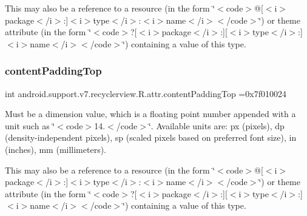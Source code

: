 This may also be a reference to a resource (in the form \char`\"{}$<$code$>$@\mbox{[}$<$i$>$package$<$/i$>$\+:\mbox{]}$<$i$>$type$<$/i$>$\+:$<$i$>$name$<$/i$>$$<$/code$>$\char`\"{}) or theme attribute (in the form \char`\"{}$<$code$>$?\mbox{[}$<$i$>$package$<$/i$>$\+:\mbox{]}\mbox{[}$<$i$>$type$<$/i$>$\+:\mbox{]}$<$i$>$name$<$/i$>$$<$/code$>$\char`\"{}) containing a value of this type. \mbox{\label{classandroid_1_1support_1_1v7_1_1recyclerview_1_1R_1_1attr_a9866843ed1b48c21614c5d076d85c4c3}} 
\subsubsection{\texorpdfstring{content\+Padding\+Top}{contentPaddingTop}}
{\footnotesize\ttfamily int android.\+support.\+v7.\+recyclerview.\+R.\+attr.\+content\+Padding\+Top =0x7f010024\hspace{0.3cm}{\ttfamily [static]}}

Must be a dimension value, which is a floating point number appended with a unit such as \char`\"{}$<$code$>$14.\+5sp$<$/code$>$\char`\"{}. Available units are\+: px (pixels), dp (density-\/independent pixels), sp (scaled pixels based on preferred font size), in (inches), mm (millimeters). 

This may also be a reference to a resource (in the form \char`\"{}$<$code$>$@\mbox{[}$<$i$>$package$<$/i$>$\+:\mbox{]}$<$i$>$type$<$/i$>$\+:$<$i$>$name$<$/i$>$$<$/code$>$\char`\"{}) or theme attribute (in the form \char`\"{}$<$code$>$?\mbox{[}$<$i$>$package$<$/i$>$\+:\mbox{]}\mbox{[}$<$i$>$type$<$/i$>$\+:\mbox{]}$<$i$>$name$<$/i$>$$<$/code$>$\char`\"{}) containing a value of this type. \mbox{\label{classandroid_1_1support_1_1v7_1_1recyclerview_1_1R_1_1attr_ae5970d35212d899f503250d67ca67181}} 
